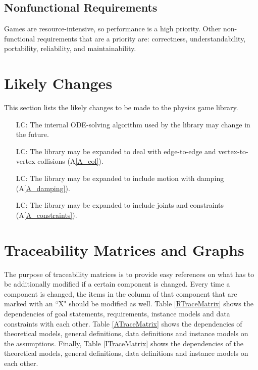 \documentclass[12pt]{article}
\newcounter{lcnum} %
\begin{document}
\subsection{Nonfunctional Requirements}
Games are resource-intensive, so performance is a high priority.
Other non-functional requirements that are a priority are: correctness,
understandability, portability, reliability, and maintainability. 


%
%

\section{Likely Changes}    

This section lists the likely changes to be made to the physics game library.

\begin{itemize}
	\item[LC\refstepcounter{lcnum}\thelcnum\label{LC_solver}:] The internal ODE-solving algorithm used by the library may change in the future.
	\item[LC\refstepcounter{lcnum}\thelcnum\label{LC_collisions}:] The library may be expanded to deal with edge-to-edge and vertex-to-vertex collisions (A\ref{A_col}).
	\item[LC\refstepcounter{lcnum}\thelcnum\label{LC_damping}:] The library may be expanded to include motion with damping (A\ref{A_damping}).
	\item[LC\refstepcounter{lcnum}\thelcnum\label{LC_constraints}:] The library may be expanded to include joints and constraints (A\ref{A_constraints}).
\end{itemize}


%
%

\section{Traceability Matrices and Graphs} \label{sec_tmag}

The purpose of traceability matrices is to provide easy references on what has to be additionally modified if a certain component is changed. Every time a component is changed, the items in the column of that component that are marked with an ``X" should be modified as well. Table \ref{RTraceMatrix} shows the dependencies of goal statements, requirements, instance models and data constraints with each other. Table \ref{ATraceMatrix} shows the dependencies of theoretical models, general definitions, data definitions and instance models on the assumptions. Finally, Table \ref{ITraceMatrix} shows the dependencies of the theoretical models, general definitions, data definitions and instance models on each other. \\
\end{document}
